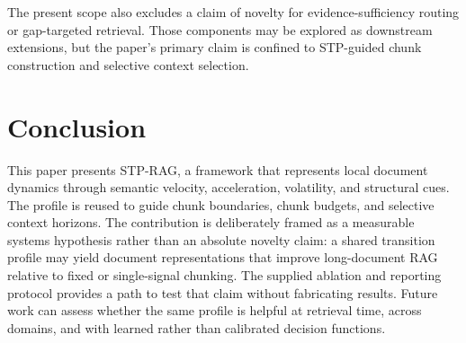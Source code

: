 \documentclass[conference]{IEEEtran}
\begin{document}
The present scope also excludes a claim of novelty for evidence-sufficiency routing or gap-targeted retrieval. Those components may be explored as downstream extensions, but the paper's primary claim is confined to STP-guided chunk construction and selective context selection.

\section{Conclusion}
This paper presents STP-RAG, a framework that represents local document dynamics through semantic velocity, acceleration, volatility, and structural cues. The profile is reused to guide chunk boundaries, chunk budgets, and selective context horizons. The contribution is deliberately framed as a measurable systems hypothesis rather than an absolute novelty claim: a shared transition profile may yield document representations that improve long-document RAG relative to fixed or single-signal chunking. The supplied ablation and reporting protocol provides a path to test that claim without fabricating results. Future work can assess whether the same profile is helpful at retrieval time, across domains, and with learned rather than calibrated decision functions.

\printbibliography
\end{document}
